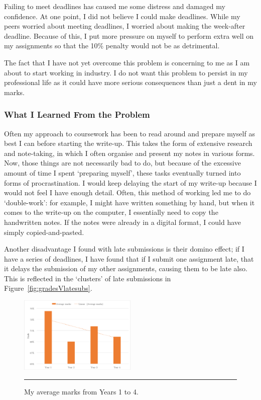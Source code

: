 Failing to meet deadlines has caused me some distress and damaged my confidence.
At one point, I did not believe I could make deadlines.
While my peers worried about meeting deadlines, I worried about making the week-after deadline.
Because of this, I put more pressure on myself to perform extra well on my assignments so that the 10\% penalty would not be as detrimental.

The fact that I have not yet overcome this problem is concerning to me as I am about to start working in industry.
I do not want this problem to persist in my professional life as it could have more serious consequences than just a dent in my marks.




\subsubsection*{What I Learned From the Problem}



Often my approach to coursework has been to read around and prepare myself as best I can before starting the write-up.
This takes the form of extensive research and note-taking, in which I often organise and present my notes in various forms.
Now, those things are not necessarily bad to do, but because of the excessive amount of time I spent `preparing myself', these tasks eventually turned into forms of procrastination.
I would keep delaying the start of my write-up because I would not feel I have enough detail.
Often, this method of working led me to do `double-work': for example, I might have written something by hand, but when it comes to the write-up on the computer, I essentially need to copy the handwritten notes.
If the notes were already in a digital format, I could have simply copied-and-pasted.

Another disadvantage I found with late submissions is their domino effect; if I have a series of deadlines, I have found that if I submit one assignment late, that it delays the submission of my other assignments, causing them to be late also.
This is reflected in the `clusters' of late submissions in Figure~\ref{fig:gradesVlatesubs}.

\begin{figure}
	\centering
	\includegraphics[width=0.5\textwidth]{figures/AverageMarks.png}
	\rule{0.5\textwidth}{0.5pt} %
	\caption{My average marks from Years 1 to 4.}
	\label{fig:averages}
\end{figure}

